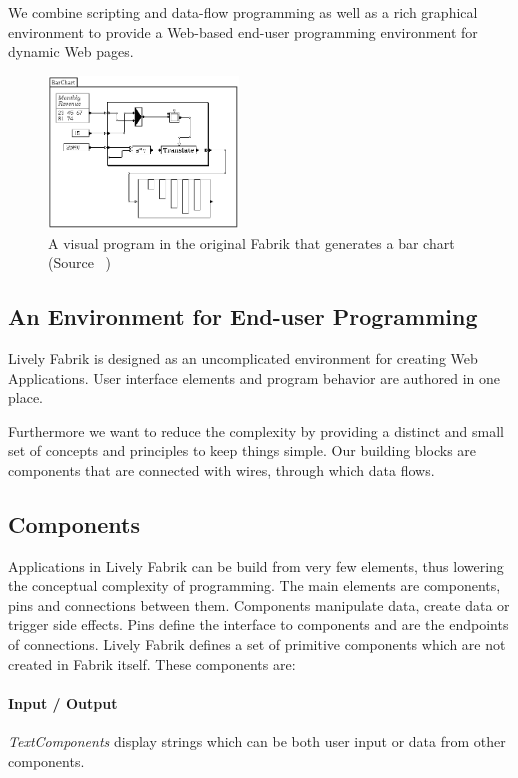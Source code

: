 \documentclass[pdftex, times, 10pt, twocolumn]{article}
\begin{document}
We combine scripting and data-flow programming as well as a rich graphical environment to provide a Web-based end-user programming environment for dynamic Web pages.  



\begin{figure}[]\centering
\includegraphics[width=0.450000\textwidth]{Fabrik_figure6.png} 

\caption{A visual program in the original Fabrik that generates a bar chart (Source ~\cite{Ingalls1988FVP}) }
\label{fig:FabrikBarChart}
\end{figure}


\subsection{An Environment for End-user Programming}
Lively Fabrik is designed as an uncomplicated environment for creating Web Applications. User interface elements and program behavior are authored in one place.  

Furthermore we want to reduce the complexity by providing a distinct and small set of concepts and principles to keep things simple. Our building blocks are components that are connected with wires, through which data flows.  



\subsection{Components}
Applications in Lively Fabrik can be build from very few elements, thus lowering the conceptual complexity of programming. The main elements are components, pins and connections between them. Components manipulate data, create data or trigger side effects. Pins define the interface to components and are the endpoints of connections. Lively Fabrik defines a set of primitive components which are not created in Fabrik itself. These components are: 



\paragraph{Input / Output}
{\em TextComponents} display strings which can be both user input or data from other components. 
\end{document}
